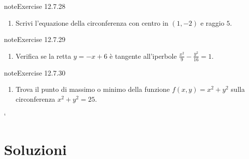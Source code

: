 \documentclass[letterpaper,10pt,italian]{jupyterBook}
\begin{document}
\begin{sphinxadmonition}{note}{Exercise 12.7.28}


\begin{enumerate}
%
\setcounter{enumi}{27}
\item {} 
\sphinxAtStartPar
Scrivi l’equazione della circonferenza con centro in \( (1, -2) \) e raggio \( 5 \).

\end{enumerate}
\end{sphinxadmonition}
 \label{exercise:ch/analytic_geometry/analytic_geometry_2d/problems-exercise-28}

\begin{sphinxadmonition}{note}{Exercise 12.7.29}


\begin{enumerate}
%
\setcounter{enumi}{28}
\item {} 
\sphinxAtStartPar
Verifica se la retta \( y = -x + 6 \) è tangente all’iperbole \( \frac{x^2}{9} - \frac{y^2}{16} = 1 \).

\end{enumerate}
\end{sphinxadmonition}
 \label{exercise:ch/analytic_geometry/analytic_geometry_2d/problems-exercise-29}

\begin{sphinxadmonition}{note}{Exercise 12.7.30}


\begin{enumerate}
%
\setcounter{enumi}{29}
\item {} 
\sphinxAtStartPar
Trova il punto di massimo o minimo della funzione \( f(x, y) = x^2 + y^2 \) sulla circonferenza \( x^2 + y^2 = 25 \).

\end{enumerate}
\end{sphinxadmonition}

\sphinxAtStartPar
`

\sphinxstepscope


\section{Soluzioni}
\label{\detokenize{ch/analytic_geometry/analytic_geometry_2d/sol:soluzioni}}\label{\detokenize{ch/analytic_geometry/analytic_geometry_2d/sol:geometry-analytic-2d-sol}}\label{\detokenize{ch/analytic_geometry/analytic_geometry_2d/sol::doc}}
\end{document}
